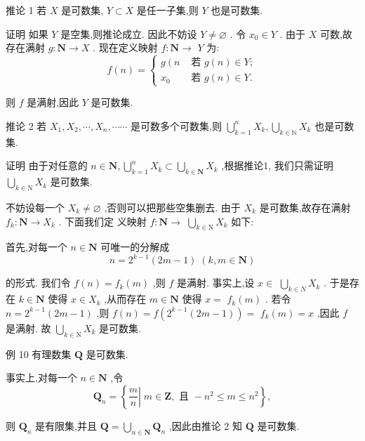 推论 1 若 $X$ 是可数集, $Y \subset  X$ 是任一子集,则 $Y$ 也是可数集.

证明 如果 $Y$ 是空集,则推论成立. 因此不妨设 $Y \neq  \varnothing$ . 令 ${x}_{0} \in  Y$ . 由于 $X$ 可数,故存在满射 $g : \mathbf{N} \rightarrow  X$ . 现在定义映射 $f : \mathbf{N} \rightarrow$  $Y$ 为:
$$f\left( n\right)  = \left\{  \begin{array}{ll} g\left( n\right. & \text{ 若 }g\left( n\right)  \in  Y; \\  {x}_{0} & \text{ 若 }g\left( n\right)  \in  Y. \end{array}\right.$$

则 $f$ 是满射,因此 $Y$ 是可数集.

推论 2 若 ${X}_{1},{X}_{2},\cdots ,{X}_{n},\cdots \cdots$ 是可数多个可数集,则 $\mathop{\bigcup }\limits_{{k = 1}}^{n}{X}_{k},\mathop{\bigcup }\limits_{{k \in  \mathbb{N}}}{X}_{k}$ 也是可数集.

证明 由于对任意的 $n \in  \mathbf{N},\mathop{\bigcup }\limits_{{k = 1}}^{n}{X}_{k} \subset  \mathop{\bigcup }\limits_{{k \in  \mathbf{N}}}{X}_{k}$ ,根据推论1, 我们只需证明 $\mathop{\bigcup }\limits_{{k \in  \mathrm{N}}}{X}_{k}$ 是可数集.

不妨设每一个 ${X}_{k} \neq  \varnothing$ ,否则可以把那些空集删去. 由于 ${X}_{k}$ 是可数集,故存在满射 ${f}_{k} : \mathbf{N} \rightarrow  {X}_{k}$ . 下面我们定 义映射 $f : \mathbf{N} \rightarrow$  $\mathop{\bigcup }\limits_{{k \in  \mathrm{N}}}{X}_{k}$ 如下:

首先,对每一个 $n \in  \mathbf{N}$ 可唯一的分解成
$$n = {2}^{k - 1}\left( {{2m} - 1}\right) \;\left( {k,m \in  \mathbf{N}}\right)$$

的形式. 我们令 $f\left( n\right)  = {f}_{k}\left( m\right)$ ,则 $f$ 是满射. 事实上,设 $x \in$  $\mathop{\bigcup }\limits_{{k \in  N}}{X}_{k}$ . 于是存在 $k \in  \mathbf{N}$ 使得 $x \in  {X}_{k}$ ,从而存在 $m \in  \mathbf{N}$ 使得 $x =$  ${f}_{k}\left( m\right)$ . 若令 $n = {2}^{k - 1}\left( {{2m} - 1}\right)$ ,则 $f\left( n\right)  = f\left( {{2}^{k - 1}\left( {{2m} - 1}\right) }\right)  =$  ${f}_{k}\left( m\right)  = x$ ,因此 $f$ 是满射. 故 $\mathop{\bigcup }\limits_{{k \in  \mathrm{N}}}{X}_{k}$ 是可数集.

例 10 有理数集 $\mathbf{Q}$ 是可数集.

事实上,对每一个 $n \in  \mathbf{N}$ ,令
$${\mathbf{Q}}_{n} = \left\{  {\left. \frac{m}{n}\right| \;m \in  \mathbf{Z},\text{ 且 } - {n}^{2} \leq  m \leq  {n}^{2}}\right\}  ,$$

则 ${\mathbf{Q}}_{n}$ 是有限集,并且 $\mathbf{Q} = \mathop{\bigcup }\limits_{{n \in  \mathbf{N}}}{\mathbf{Q}}_{n}$ ,因此由推论 2 知 $\mathbf{Q}$ 是可数集.

